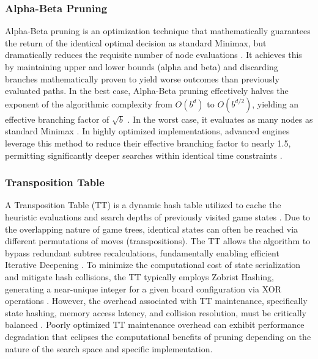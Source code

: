 \subsubsection{Alpha-Beta Pruning}
Alpha-Beta pruning is an optimization technique that mathematically guarantees the return of the identical optimal decision as standard Minimax, but dramatically reduces the requisite number of node evaluations \cite{knuth1975analysis}. It achieves this by maintaining upper and lower bounds (alpha and beta) and discarding branches mathematically proven to yield worse outcomes than previously evaluated paths. In the best case, Alpha-Beta pruning effectively halves the exponent of the algorithmic complexity from $O(b^d)$ to $O(b^{d/2})$, yielding an effective branching factor of $\sqrt{b}$ \cite{Artificial_intelligence}. In the worst case, it evaluates as many nodes as standard Minimax \cite{knuth1975analysis}. In highly optimized implementations, advanced engines leverage this method to reduce their effective branching factor to nearly 1.5, permitting significantly deeper searches within identical time constraints \cite{SA2020survey}.

\subsubsection{Transposition Table} \label{back tt}
A Transposition Table (TT) is a dynamic hash table utilized to cache the heuristic evaluations and search depths of previously visited game states \cite{nelson1985hash}. Due to the overlapping nature of game trees, identical states can often be reached via different permutations of moves (transpositions). The TT allows the algorithm to bypass redundant subtree recalculations, fundamentally enabling efficient Iterative Deepening \cite{slate1977chess}. To minimize the computational cost of state serialization and mitigate hash collisions, the TT typically employs Zobrist Hashing, generating a near-unique integer for a given board configuration via XOR operations \cite{zobrist1970new}. However, the overhead associated with TT maintenance, specifically state hashing, memory access latency, and collision resolution, must be critically balanced \cite{breuker1996replacement}. Poorly optimized TT maintenance overhead can exhibit performance degradation that eclipses the computational benefits of pruning depending on the nature of the search space and specific implementation.

